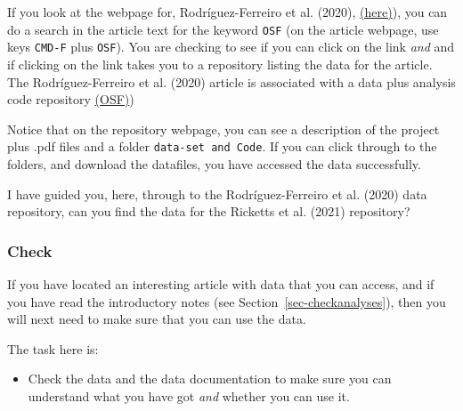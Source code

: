 \documentclass[
  letterpaper,
  DIV=11,
  numbers=noendperiod]{scrreprt}
\providecommand{\tightlist}{%
  \setlength{\itemsep}{0pt}\setlength{\parskip}{0pt}}\usepackage{longtable,booktabs,array}
\begin{document}
If you look at the webpage for, Rodríguez-Ferreiro et al. (2020),
\href{https://peerj.com/articles/9511/}{(here)}), you can do a search in
the article text for the keyword \texttt{OSF} (on the article webpage,
use keys \texttt{CMD-F} plus \texttt{OSF}). You are checking to see if
you can click on the link \emph{and} and if clicking on the link takes
you to a repository listing the data for the article. The
Rodríguez-Ferreiro et al. (2020) article is associated with a data plus
analysis code repository \href{https://osf.io/j29fn/}{(OSF)})

Notice that on the repository webpage, you can see a description of the
project plus .pdf files and a folder \texttt{data-set\ and\ Code}. If
you can click through to the folders, and download the datafiles, you
have accessed the data successfully.

I have guided you, here, through to the Rodríguez-Ferreiro et al. (2020)
data repository, can you find the data for the Ricketts et al. (2021)
repository?

\hypertarget{sec-check}{%
\subsubsection{Check}\label{sec-check}}

If you have located an interesting article with data that you can
access, and if you have read the introductory notes (see
Section~\ref{sec-checkanalyses}), then you will next need to make sure
that you can use the data.

\begin{tcolorbox}[enhanced jigsaw, opacitybacktitle=0.6, title=\textcolor{quarto-callout-tip-color}{\faLightbulb}\hspace{0.5em}{Tip}, arc=.35mm, colbacktitle=quarto-callout-tip-color!10!white, colframe=quarto-callout-tip-color-frame, leftrule=.75mm, opacityback=0, breakable, titlerule=0mm, left=2mm, bottomrule=.15mm, toprule=.15mm, colback=white, coltitle=black, bottomtitle=1mm, toptitle=1mm, rightrule=.15mm]

The task here is:

\begin{itemize}
\tightlist
\item
  Check the data and the data documentation to make sure you can
  understand what you have got \emph{and} whether you can use it.
\end{itemize}

\end{tcolorbox}
\end{document}
